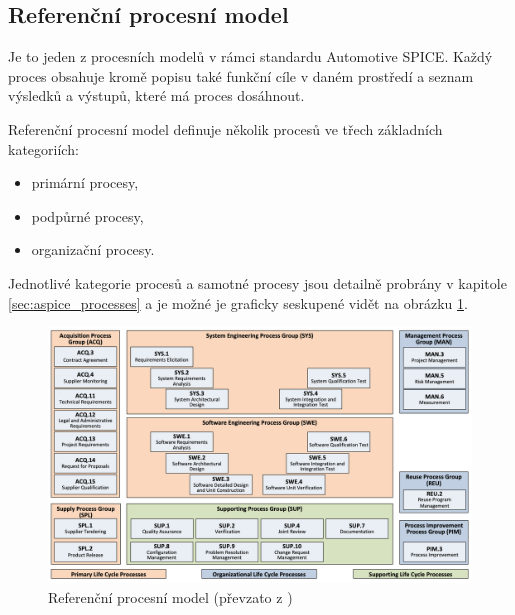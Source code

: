 \documentclass[czech,master,public,dept460,male,cpdeclaration,oneside]{diploma}
\begin{document}
\subsection{Referenční procesní model}
Je to jeden z procesních modelů v rámci standardu Automotive SPICE. 
Každý proces obsahuje kromě popisu také funkční cíle v daném prostředí a seznam výsledků a výstupů, které má proces dosáhnout.
\cite{ref:aspice_download_procesni_modely}


Referenční procesní model definuje několik procesů ve třech základních kategoriích:

\begin{itemize}

\item primární procesy,
\item podpůrné procesy,
\item organizační procesy.

\end{itemize}

Jednotlivé kategorie procesů a samotné procesy jsou detailně probrány v kapitole \ref{sec:aspice_processes} a je možné je graficky seskupené vidět na obrázku \ref{fig:prm}. 
\begin{figure}[!ht]
    \centering
    \includegraphics[width=1\textwidth]{Diplomka/Figures/prm.png}
    \caption{Referenční procesní model (převzato z \cite{ref:aspice_download_prm})}
    \label{fig:prm}
\end{figure}
\end{document}
